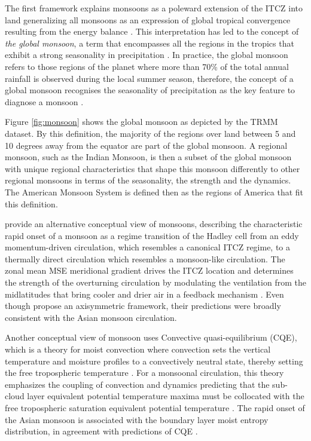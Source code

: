 The first framework  explains monsoons as a poleward extension of the ITCZ into land  generalizing all monsoons as an expression of global tropical convergence resulting from the energy balance \citep{chao2001origin,gadgil2018}. This interpretation has led to the concept of \textit{the global monsoon}, a term that encompasses all the regions in the tropics that exhibit a strong seasonality in precipitation \citep{zhou2016,gadgil2018}. 
In practice, the global monsoon refers to those regions of the planet where more than 70\% of the total annual rainfall is observed during the local summer season, therefore, the concept of a global monsoon recognises the seasonality of precipitation as the key feature to diagnose a monsoon \citep{zhou2016,wang2017}.

Figure \ref{fig:monsoon} shows the global monsoon as depicted by the TRMM dataset. By this definition, the majority of the regions over land between 5 and 10 degrees away from the equator are part of the global monsoon.
A regional monsoon, such as the Indian Monsoon, is then a subset of the global monsoon with unique regional characteristics that shape this monsoon differently to other regional monsoons in terms of the seasonality, the strength and the dynamics. 
The American Monsoon System is defined then as the regions of America that fit this definition. %


\cite{bordoni2008monsoons} provide an alternative conceptual view of monsoons, describing the characteristic rapid onset of a monsoon as a regime transition of the Hadley cell from an eddy momentum-driven circulation, which resembles a canonical ITCZ regime, to a thermally direct circulation which resembles a monsoon-like circulation. The zonal mean MSE meridional gradient drives the ITCZ location and determines the strength of the overturning circulation by modulating the ventilation from the midlatitudes that bring cooler and drier air in a feedback mechanism \citep{geen2020}. Even though \cite{bordoni2008monsoons} propose an axisymmetric framework, their predictions were broadly consistent with the Asian monsoon circulation. 


Another conceptual view of monsoon uses Convective quasi-equilibrium (CQE), which is a theory for moist convection where convection sets the vertical temperature and moisture profiles to a convectively neutral state, thereby setting the free tropospheric temperature \citep{neelin2007moist}. For a monsoonal circulation, this theory emphasizes the coupling of convection and dynamics predicting that the sub-cloud layer equivalent potential temperature maxima must be collocated with the free tropospheric saturation equivalent potential temperature \citep{nie2010observational,geen2020}. The rapid onset of the Asian monsoon is associated with the boundary layer moist entropy distribution, in agreement with predictions of CQE \citep{nie2010observational,boos2015review,ma2019}.


